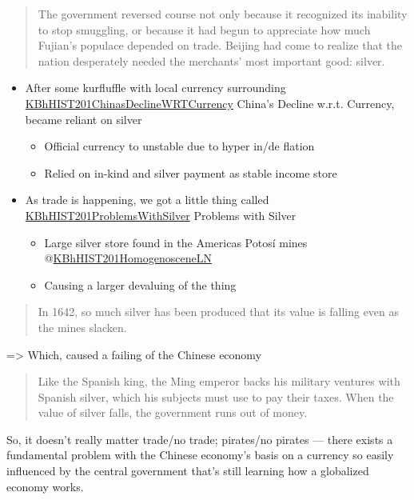 \documentclass[letterpaper]{article}
\begin{document}
\begin{quote}
The government reversed course not only because it recognized its
inability to stop smuggling, or because it had begun to appreciate how
much Fujian's populace depended on trade. Beijing had come to realize
that the nation desperately needed the merchants' most important good:
silver.
\end{quote}

\begin{itemize}
\item After some kurfluffle with local currency surrounding
\href{KBhHIST201ChinasDeclineWRTCurrency.org}{KBhHIST201ChinasDeclineWRTCurrency}
China's Decline w.r.t. Currency, became reliant on silver

\begin{itemize}
\item Official currency to unstable due to hyper in/de flation
\item Relied on in-kind and silver payment as stable income store
\end{itemize}

\item As trade is happening, we got a little thing called
\href{KBhHIST201ProblemsWithSilver.org}{KBhHIST201ProblemsWithSilver}
Problems with Silver

\begin{itemize}
\item Large silver store found in the Americas Potosí mines
@\href{KBhHIST201HomogenosceneLN.org}{KBhHIST201HomogenosceneLN}
\item Causing a larger devaluing of the thing
\end{itemize}
\end{itemize}

\begin{quote}
In 1642, so much silver has been produced that its value is falling
even as the mines slacken.
\end{quote}

=> Which, caused a failing of the Chinese economy

\begin{quote}
Like the Spanish king, the Ming emperor backs his military ventures
with Spanish silver, which his subjects must use to pay their taxes.
When the value of silver falls, the government runs out of money.
\end{quote}

So, it doesn't really matter trade/no trade; pirates/no pirates ---
there exists a fundamental problem with the Chinese economy's basis on a
currency so easily influenced by the central government that's still
learning how a globalized economy works.
\end{document}
